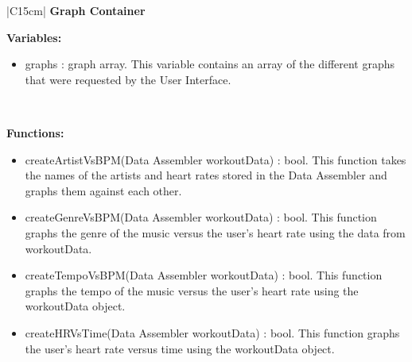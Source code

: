 \documentclass[letterpaper,english, 12pt]{scrreprt}
\begin{document}
\begin{center}
	\begin{tabular}{|C{15cm}|}
		\hline
			\textbf{Graph Container} \\
		\hline
			\begin{flushleft}
				\textbf{Variables:} \\
			\end{flushleft}
				\begin{itemize}
					\item graphs : graph array. This variable contains an array of the different graphs that were requested by the User Interface.
				\end{itemize} \\
			\hline
			\begin{flushleft}
				\textbf{Functions: } \\
			\end{flushleft}
				\begin{itemize}
					\item createArtistVsBPM(Data Assembler workoutData) : bool. This function takes the names of the artists and heart rates stored in the Data Assembler and graphs them against each other.
					\item createGenreVsBPM(Data Assembler workoutData) : bool. This function graphs the genre of the music versus the user's heart rate using the data from workoutData.
					\item createTempoVsBPM(Data Assembler workoutData) : bool. This function graphs the tempo of the music versus the user's heart rate using the workoutData object.
					\item createHRVsTime(Data Assembler workoutData) : bool. This function graphs the user's heart rate versus time using the workoutData object.
				\end{itemize}
			\hline
	\end{tabular}
\end{center}
\end{document}
